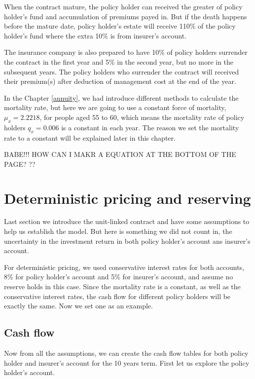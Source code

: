 \documentclass{report}
\begin{document}
When the contract mature, the policy holder can received the greater of policy holder's fund and accumulation of premiums payed in. But if the death happens before the mature date, policy holder's estate will receive 110\% of the policy holder's fund where the extra 10\% is from insurer's account.

The insurance company is also prepared to have 10\% of policy holders surrender the contract in the first year and 5\% in the second year, but no more in the subsequent years. The policy holders who surrender the contract will received their premium(s) after deduction of management cost at the end of the year.

In the Chapter \ref{annuity}, we had introduce different methods to calculate the mortality rate, but here we are going to use a constant force of mortality, $\mu_x=2.2218$, for people aged 55 to 60, which means the mortality rate of policy holders $q_x=0.006$ is a constant in each year. The reason we set the mortality rate to a constant will be explained later in this chapter.  

BABE!!! HOW CAN I MAKR A EQUATION AT THE BOTTOM OF THE PAGE? ??



\section{Deterministic pricing and reserving}

Last section we introduce the unit-linked contract and have some assumptions to help us establish the model. But here is something we did not count in, the uncertainty in the investment return in both policy holder's account ans insurer's account. 

For deterministic pricing, we used conservative interest rates for both accounts, 8\% for policy holder's account and 5\% for insurer's account, and assume no reserve holds in this case. Since the mortality rate is a constant, as well as the conservative interest rates, the cash flow for different policy holders will be exactly the same. Now we set one as an example.

\subsection{Cash flow}

Now from all the assumptions, we can create the cash flow tables for both policy holder and insurer's account for the  10 years term. First let us explore the policy holder's account. 
\end{document}
